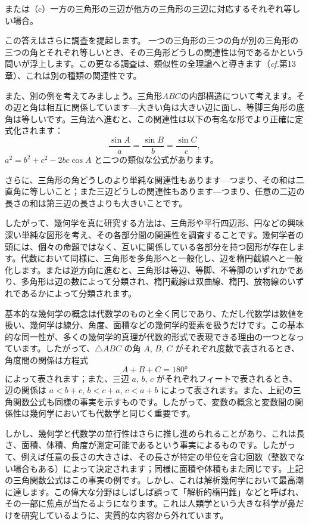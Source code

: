 \documentclass[a4paper,11pt,openany]{ltjsbook}
\providecommand{\cf}{\emph{cf.}}
\begin{document}
または（c）一方の三角形の三辺が他方の三角形の三辺に対応するそれぞれ等しい場合。

この答えはさらに調査を提起します。
一つの三角形の三つの角が別の三角形の三つの角とそれぞれ等しいとき、その三角形どうしの関連性は何であるかという問いが浮上します。この更なる調査は、類似性の全理論へと導きます（\cf 第13章）、これは別の種類の関連性です。

また、別の例を考えてみましょう。三角形$ABC$の内部構造について考えます。その辺と角は相互に関係しています---大きい角は大きい辺に面し、等脚三角形の底角は等しいです。三角法へ進むと、この関連性は以下の有名な形でより正確に定式化されます：
\[
\frac{\sin A}{a} = \frac{\sin B}{b} = \frac{\sin C}{c},
\]
$a^{2} = b^{2} + c^{2} - 2bc \cos A$ と二つの類似な公式があります。

さらに、三角形の角どうしのより単純な関連性もあります---つまり、その和は二直角に等しいこと；また三辺どうしの関連性もあります---つまり、任意の二辺の長さの和は第三辺の長さよりも大きいことです。

したがって、幾何学を真に研究する方法は、三角形や平行四辺形、円などの興味深い単純な図形を考え、その各部分間の関連性を調査することです。幾何学者の頭には、個々の命題ではなく、互いに関係している各部分を持つ図形が存在します。代数において同様に、三角形を多角形へと一般化し、辺を楕円截線へと一般化します。または逆方向に進むと、三角形は等辺、等脚、不等脚のいずれかであり、多角形は辺の数によって分類され、楕円截線は双曲線、楕円、放物線のいずれであるかによって分類されます。

基本的な幾何学の概念は代数学のものと全く同じであり、ただし代数学は数値を扱い、幾何学は線分、角度、面積などの幾何学的要素を扱うだけです。この基本的な同一性が、多くの幾何学的真理が代数的形式で表現できる理由の一つとなっています。したがって、$\triangle ABC$ の角 $A$, $B$, $C$ がそれぞれ度数で表されるとき、角度間の関係は方程式
\[
A + B + C = 180°
\]
によって表されます；また、三辺 $a$, $b$, $c$ がそれぞれフィートで表されるとき、辺の関係は $a < b + c$, $b < c + a$, $c < a + b$ によって表されます。また、上記の三角関数公式も同様の事実を示すものです。したがって、変数の概念と変数間の関係性は幾何学においても代数学と同じく重要です。

しかし、幾何学と代数学の並行性はさらに推し進められることがあり、これは長さ、面積、体積、角度が測定可能であるという事実によるものです。したがって、例えば任意の長さの大きさは、その長さが特定の単位を含む回数（整数でない場合もある）によって決定されます；同様に面積や体積もまた同じです。上記の三角関数公式はこの事実の例です。しかし、これは解析幾何学において最高潮に達します。この偉大な分野はしばしば誤って「解析的楕円錐」などと呼ばれ、その一部に焦点が当たるようになります。これは人類学という大きな科学が鼻だけを研究しているように、実質的な内容から外れています。
\end{document}

